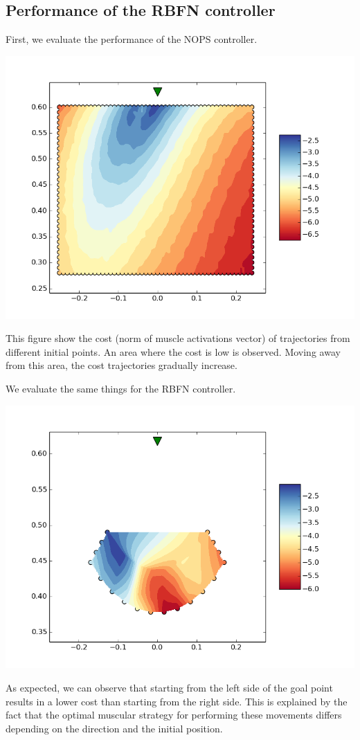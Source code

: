 \documentclass[pdftex,a4paper,11pt]{report}
\begin{document}
\subsection{Performance of the RBFN controller}
First, we evaluate the performance of the NOPS controller.
\begin{center}
\includegraphics[scale=0.5]{figures/costMapBrent.png}
\end{center}
This figure show the cost (norm of muscle activations vector) of trajectories from different initial points.
An area where the cost is low is observed. Moving away from this area, the cost trajectories gradually increase.

We evaluate the same things for the RBFN controller.
\begin{center}
\includegraphics[scale=0.5]{figures/costMapRBFNShuffle1.png}
\end{center}
As expected, we can observe that starting from the left side of the goal point results in a lower cost than starting from the right side. This is explained by the fact that the optimal muscular strategy for performing these movements differs depending on the direction and the initial position.
\end{document}
